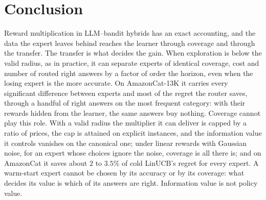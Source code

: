 \documentclass[anon]{alt2027} %
\begin{document}
\section{Conclusion}
\label{sec:conclusion}

Reward multiplication in LLM--bandit hybrids has an exact accounting, and the
data the expert leaves behind reaches the learner through coverage and
through the transfer. The transfer is what decides the gain. When
exploration is below the valid radius, as in practice, it can separate
experts of identical coverage, cost and number of routed right answers by a
factor of order the horizon, even when the losing expert is the more
accurate. On AmazonCat-13K it carries every significant difference between
experts and most of the regret the router saves, through a handful of right
answers on the most frequent category: with their rewards hidden from the
learner, the same answers buy nothing. Coverage cannot play this role. With a
valid radius the multiplier it can deliver is capped by a ratio of prices,
the cap is attained on explicit instances, and the information value it
controls vanishes on the canonical one; under linear rewards with Gaussian
noise, for an expert whose choices ignore the noise, coverage is all there
is; and on AmazonCat it saves about $2$ to $3.5\%$ of cold LinUCB's regret
for every expert. A warm-start expert cannot be chosen by its accuracy or by
its coverage: what decides its value is which of its answers are right.
Information value is not policy value.
\end{document}
